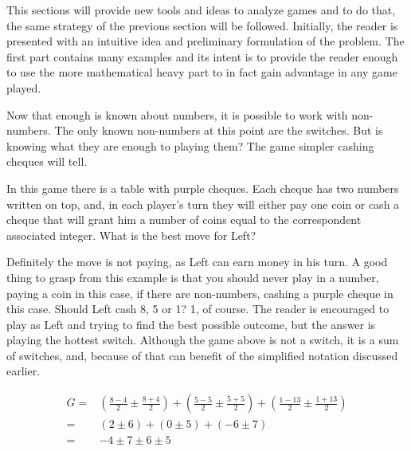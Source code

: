
This sections will provide new tools and ideas to analyze games and to do that, the same strategy of the previous section will be followed. Initially, the reader is presented with an intuitive idea and preliminary formulation of the problem. The first part contains many examples and its intent is to provide the reader enough to use the more mathematical heavy part to in fact gain advantage in any game played.

Now that enough is known about numbers, it is possible to work with non-numbers. The only known non-numbers at this point are the switches. But is knowing what they are enough to playing them? The game simpler cashing cheques will tell.

In this game there is a table with purple cheques. Each cheque has two numbers written on top, and, in each player's turn they will either pay one coin or cash a cheque that will grant him a number of coins equal to the correspondent associated integer. What is the best move for Left?

\begin{center}
\end{center}

Definitely the move is not paying, as Left can earn money in his turn. A good thing to grasp from this example is that you should never play in a number, paying a coin in this case, if there are non-numbers, cashing a purple cheque in this case. Should Left cash 8, 5 or 1? 1, of course. The reader is encouraged to play as Left and trying to find the best possible outcome, but the answer is playing the hottest switch. Although the game above is not a switch, it is a sum of switches, and, because of that can benefit of the simplified notation discussed earlier.

\begin{align*}
	G =& \left(\frac{8-4}{2} \pm \frac{8+4}{2}\right) + \left(\frac{5-5}{2} \pm \frac{5+5}{2}\right) + \left(\frac{1-13}{2} \pm \frac{1+13}{2}\right) \\
	  =& (2 \pm 6) + (0 \pm 5) + (-6 \pm 7)\\
	  =& -4 \pm 7 \pm 6 \pm 5
\end{align*}

